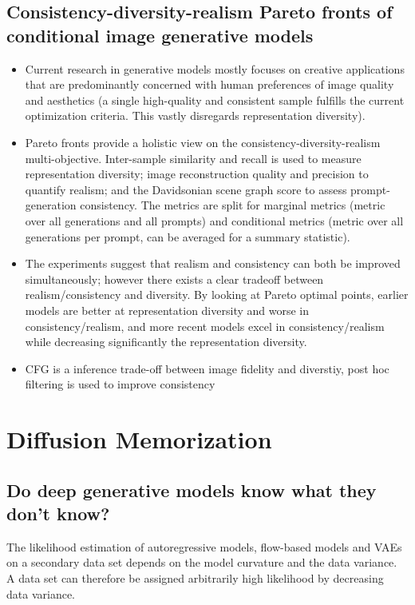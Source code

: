 \documentclass{article}
\begin{document}
\subsection{Consistency-diversity-realism Pareto fronts of conditional image generative models}
\begin{itemize}
    \item Current research in generative models mostly focuses on creative applications that are predominantly concerned with human preferences of image quality and aesthetics (a single high-quality and consistent sample fulfills the current optimization criteria. This vastly disregards representation diversity). 
    \item Pareto fronts provide a holistic view on the consistency-diversity-realism multi-objective. Inter-sample similarity and recall is used to measure representation diversity; image reconstruction quality and precision to quantify realism; and the Davidsonian scene graph score to assess prompt-generation consistency. The metrics are split for marginal metrics (metric over all generations and all prompts) and conditional metrics (metric over all generations per prompt, can be averaged for a summary statistic).
    \item The experiments suggest that realism and consistency can both be improved simultaneously; however there exists a clear tradeoff between realism/consistency and diversity. By looking at Pareto optimal points, earlier models are better at representation diversity and worse in consistency/realism, and more recent models excel in consistency/realism while decreasing significantly the representation diversity.
    \item CFG is a inference trade-off between image fidelity and diverstiy, post hoc filtering is used to improve consistency
\end{itemize}


\section{Diffusion Memorization}

\subsection{Do deep generative models know what they don't know?}

\begin{tldr}
The likelihood estimation of autoregressive models, flow-based models and VAEs on a secondary data set depends on the model curvature and the data variance. A data set can therefore be assigned arbitrarily high likelihood by decreasing data variance.
\end{tldr}
\end{document}
